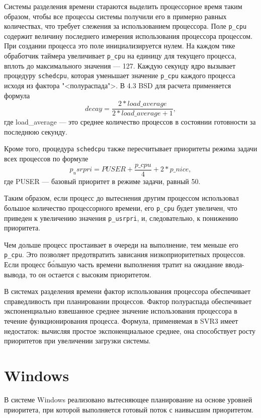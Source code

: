 \documentclass[a4paper,oneside,14pt]{extreport}
\newcommand{\code}[1]{\texttt{#1}}
\begin{document}
Системы разделения времени стараются выделить процессорное время таким образом, чтобы все процессы системы получили его в примерно равных количествах, что требует слежения за использованием процессора. Поле \code{p{\_}cpu} содержит величину последнего измерения использования процессора процессом. При создании процесса это поле инициализируется нулем. На каждом тике обработчик таймера увеличивает \code{p{\_}cpu} на единицу для текущего процесса, вплоть до максимального значения --- 127. Каждую секунду ядро вызывает процедуру \code{schedcpu}, которая уменьшает значение \code{p{\_}cpu} каждого процесса исходя из фактора "<полураспада">. В 4.3 BSD для расчета применяется формула
\[
decay = \frac{2*load{\_}average}{2*load{\_}average + 1},
\]
где load{\_}average --- это среднее количество процессов в состоянии готовности за последнюю секунду.

Кроме того, процедура \code{schedcpu} также пересчитывает приоритеты режима задачи всех процессов по формуле
\[
{p_usrpri} = PUSER + \frac{p{\_}cpu}{4} + 2*{p{\_}nice},
\]
где PUSER --- базовый приоритет в режиме задачи, равный 50.

Таким образом, если процесс до вытеснения другим процессом использовал большое количество процессорного времени, его \code{p{\_}cpu} будет увеличен, что приведен к увеличению значения \code{p{\_}usrpri}, и, следовательно, к понижению приоритета.

Чем дольше процесс простаивает в очереди на выполнение, тем меньше его \code{p{\_}cpu}. Это позволяет предотвратить зависания низкоприоритетных процессов. Если процесс б\'{о}льшую часть времени выполнения тратит на ожидание ввода-вывода, то он остается с высоким приоритетом.

В системах разделения времени фактор использования процессора обеспечивает справедливость при планировании процессов. Фактор полураспада обеспечивает экспоненциально взвешанное среднее значение использования процессора в течение функционирования процесса. Формула, применяемая в SVR3 имеет недостаток: вычисляя простое экспоненциальное среднее, она способствует росту приоритетов при увеличении загрузки системы.

\section{Windows}

В системе Windows реализовано вытесняющее планирование на основе уровней приоритета, при которой выполняется готовый поток с наивысшим приоритетом.
\end{document}
